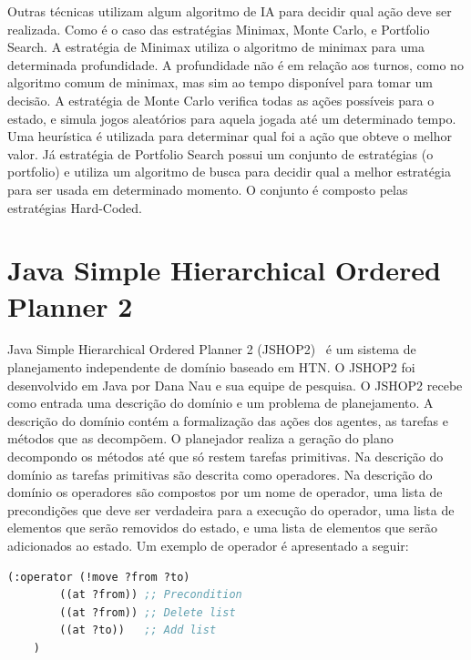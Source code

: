 Outras técnicas utilizam algum algoritmo de IA para decidir qual ação deve ser realizada.
Como é o caso das estratégias Minimax, Monte Carlo, e Portfolio Search.
A estratégia de Minimax utiliza o algoritmo de minimax para uma determinada profundidade. A profundidade não é em relação aos turnos, como no algoritmo comum de minimax, mas sim ao tempo disponível para tomar um decisão.
A estratégia de Monte Carlo verifica todas as ações possíveis para o estado, e simula jogos aleatórios para aquela jogada até um determinado tempo. Uma heurística é utilizada para determinar qual foi a ação que obteve o melhor valor.
Já estratégia de Portfolio Search possui um conjunto de estratégias (o portfolio) e utiliza um algoritmo de busca para decidir qual a melhor estratégia para ser usada em determinado momento. 
O conjunto é composto pelas estratégias Hard-Coded.

\section{Java Simple Hierarchical Ordered Planner 2}\label{sec:jshop}
		
Java Simple Hierarchical Ordered Planner 2 (JSHOP2)~\cite{ilghami2006documentation} é um sistema de planejamento independente de domínio baseado em HTN. 
O JSHOP2 foi desenvolvido em Java por Dana Nau e sua equipe de pesquisa. 
O JSHOP2 recebe como entrada uma descrição do domínio e um problema de planejamento. 
A descrição do domínio contém a formalização das ações dos agentes, as tarefas e métodos que as decompõem.
O planejador realiza a geração do plano decompondo os métodos até que só restem tarefas primitivas. 
Na descrição do domínio as tarefas primitivas são descrita como operadores. 
Na descrição do domínio os operadores são compostos por um nome de operador, uma lista de precondições que deve ser verdadeira para a execução do operador, uma lista de elementos que serão removidos do estado, e uma lista de elementos que serão adicionados ao estado. 
Um exemplo de operador é apresentado a seguir:

\lstset{style=codeStyle}
\begin{lstlisting}[language=lisp]
	(:operator (!move ?from ?to) 
		((at ?from)) ;; Precondition
		((at ?from)) ;; Delete list
		((at ?to))   ;; Add list
	)
\end{lstlisting}

